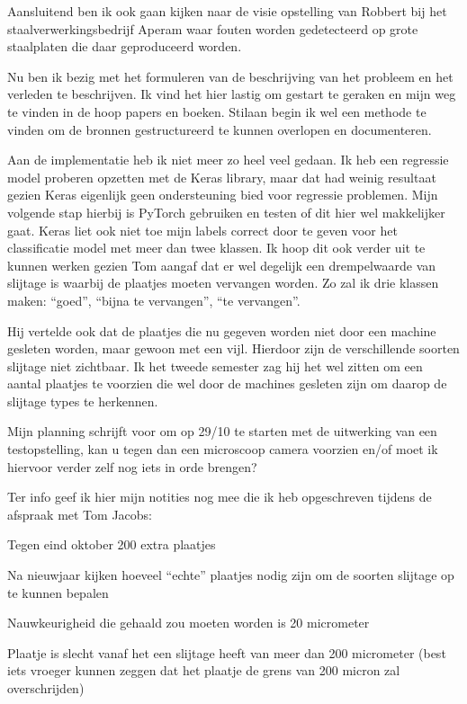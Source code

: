 \documentclass{article}
\begin{document}
Aansluitend ben ik ook gaan kijken naar de visie opstelling van Robbert bij het staalverwerkingsbedrijf Aperam waar fouten worden gedetecteerd op grote staalplaten die daar geproduceerd worden.

 

Nu ben ik bezig met het formuleren van de beschrijving van het probleem en het verleden te beschrijven. Ik vind het hier lastig om gestart te geraken en mijn weg te vinden in de hoop papers en boeken. Stilaan begin ik wel een methode te vinden om de bronnen gestructureerd te kunnen overlopen en documenteren.

 

Aan de implementatie heb ik niet meer zo heel veel gedaan. Ik heb een regressie model proberen opzetten met de Keras library, maar dat had weinig resultaat gezien Keras eigenlijk geen ondersteuning bied voor regressie problemen. Mijn volgende stap hierbij is PyTorch gebruiken en testen of dit hier wel makkelijker gaat. Keras liet ook niet toe mijn labels correct door te geven voor het classificatie model met meer dan twee klassen. Ik hoop dit ook verder uit te kunnen werken gezien Tom aangaf dat er wel degelijk een drempelwaarde van slijtage is waarbij de plaatjes moeten vervangen worden. Zo zal ik drie klassen maken: {“goed”, “bijna te vervangen”, “te vervangen”}.

Hij vertelde ook dat de plaatjes die nu gegeven worden niet door een machine gesleten worden, maar gewoon met een vijl. Hierdoor zijn de verschillende soorten slijtage niet zichtbaar. Ik het tweede semester zag hij het wel zitten om een aantal plaatjes te voorzien die wel door de machines gesleten zijn om daarop de slijtage types te herkennen.

 

Mijn planning schrijft voor om op 29/10 te starten met de uitwerking van een testopstelling, kan u tegen dan een microscoop camera voorzien en/of moet ik hiervoor verder zelf nog iets in orde brengen?

 

Ter info geef ik hier mijn notities nog mee die ik heb opgeschreven tijdens de afspraak met Tom Jacobs:

Tegen eind oktober 200 extra plaatjes

Na nieuwjaar kijken hoeveel “echte” plaatjes nodig zijn om de soorten slijtage op te kunnen bepalen

Nauwkeurigheid die gehaald zou moeten worden is 20 micrometer

Plaatje is slecht vanaf het een slijtage heeft van meer dan 200 micrometer (best iets vroeger kunnen zeggen dat het plaatje de grens van 200 micron zal overschrijden)
\end{document}
